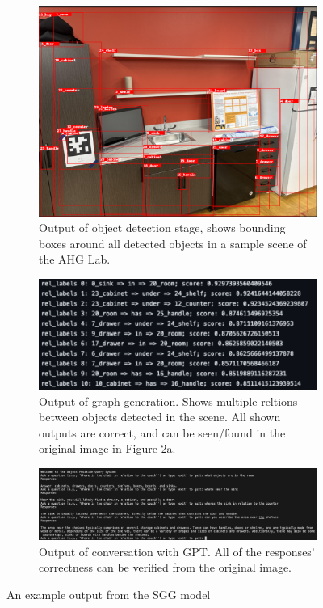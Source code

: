 \documentclass[letterpaper, 10 pt, conference]{ieeeconf}  %
\begin{document}
    \begin{figure}
        \centering
        \begin{subfigure}{0.48\textwidth}
            \centering
            \includegraphics[width=1\textwidth]{images/scene.png}
            \caption{Output of object detection stage, shows bounding boxes around all detected objects in a sample scene of the AHG Lab.}
            \label{fig:outputs}
        \end{subfigure}
        \begin{subfigure}{0.48\textwidth}
            \centering
            \includegraphics[width=1\textwidth]{images/graph.png}
            \caption{Output of graph generation. Shows multiple reltions between objects detected in the scene. All shown outputs are correct, and can be seen/found in the original image in Figure 2a.}
            \label{fig:graph}
        \end{subfigure}
        \begin{subfigure}{0.48\textwidth}
            \centering
            \includegraphics[width=1\textwidth]{images/output.png}
            \caption{Output of conversation with GPT. All of the responses' correctness can be verified from the original image.}
            \label{fig:output}
        \end{subfigure}
        \caption{An example output from the SGG model}
        \label{fig:example}
        

\end{figure}
\end{document}
